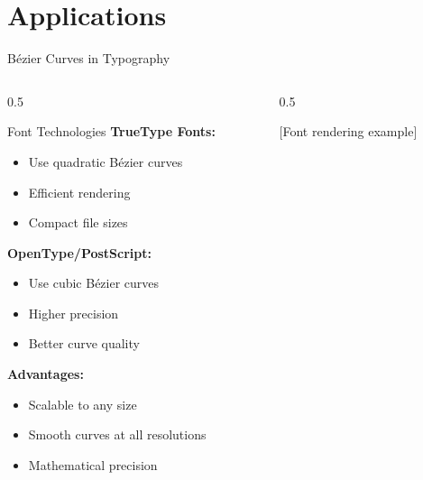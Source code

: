 \section{Applications}

\begin{frame}{Bézier Curves in Typography}
  \begin{columns}
    \begin{column}{0.5\textwidth}
      \begin{conceptbox}{Font Technologies}
        \footnotesize
        \textbf{TrueType Fonts:}
        \begin{itemize}
          \item Use quadratic Bézier curves
          \item Efficient rendering
          \item Compact file sizes
        \end{itemize}

        \textbf{OpenType/PostScript:}
        \begin{itemize}
          \item Use cubic Bézier curves
          \item Higher precision
          \item Better curve quality
        \end{itemize}

        \textbf{Advantages:}
        \begin{itemize}
          \item Scalable to any size
          \item Smooth curves at all resolutions
          \item Mathematical precision
        \end{itemize}
      \end{conceptbox}
    \end{column}
    \begin{column}{0.5\textwidth}
      \begin{center}
        \textcolor{AccentColor}{[Font rendering example]}

        \vspace{0.5cm}

\end{center}
\end{column}
\end{columns}
\end{frame}
